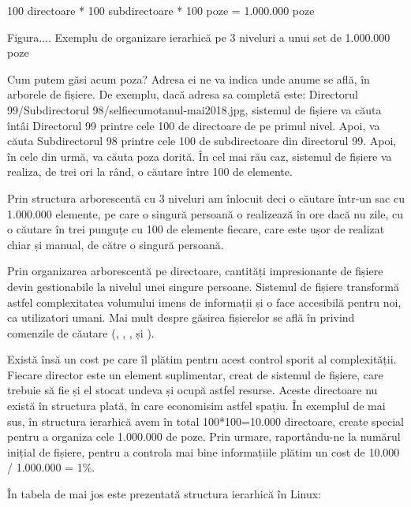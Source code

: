 100 directoare * 100 subdirectoare * 100 poze = 1.000.000 poze

Figura.... Exemplu de organizare ierarhică pe 3 niveluri a unui set de 1.000.000
poze

Cum putem găsi acum poza? Adresa ei ne va indica unde anume se află, în arborele
de fișiere. De exemplu, dacă adresa sa completă este: Directorul
99/Subdirectorul 98/selfiecumotanul-mai2018.jpg, sistemul de fișiere va căuta
întâi Directorul 99 printre cele 100 de directoare de pe primul nivel.  Apoi, va
căuta Subdirectorul 98 printre cele 100 de subdirectoare din directorul 99.
Apoi, în cele din urmă, va căuta poza dorită. În cel mai rău caz, sistemul de
fișiere va realiza, de trei ori la rând, o căutare între 100 de elemente.

Prin structura arborescentă cu 3 niveluri am înlocuit deci o căutare într-un sac
cu 1.000.000 elemente, pe care o singură persoană o realizează în ore dacă nu
zile, cu o căutare în trei punguțe cu 100 de elemente fiecare, care este ușor de
realizat chiar și manual, de către o singură persoană.

Prin organizarea arborescentă pe directoare, cantități impresionante de fișiere
devin gestionabile la nivelul unei singure persoane. Sistemul de fișiere
transformă astfel complexitatea volumului imens de informații și o face
accesibilă pentru noi, ca utilizatori umani. Mai mult despre găsirea fișierelor
se află în  privind
comenzile de căutare (, , ,  și
).

Există însă un cost pe care îl plătim pentru acest control sporit al
complexității. Fiecare director este un element suplimentar, creat de sistemul
de fișiere, care trebuie să fie și el stocat undeva și ocupă astfel resurse.
Aceste directoare nu există în structura plată, în care economisim astfel
spațiu. În exemplul de mai sus, în structura ierarhică avem în total
100*100=10.000 directoare, create special pentru a organiza cele 1.000.000 de
poze. Prin urmare, raportându-ne la numărul inițial de fișiere, pentru a
controla mai bine informațiile plătim un cost de 10.000 / 1.000.000 = 1\%.


În tabela de mai jos este prezentată structura ierarhică în Linux:

